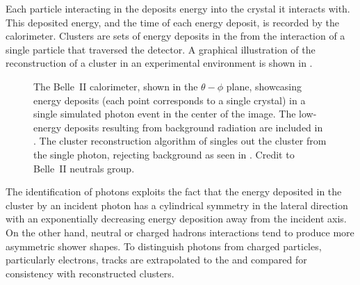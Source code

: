 Each particle interacting in the \ECL deposits energy into the crystal it interacts with.
This deposited energy, and the time of each energy deposit, is recorded by the calorimeter.
Clusters are sets of energy deposits in the \ECL from the interaction of a single particle that traversed the detector.
A graphical illustration of the reconstruction of a cluster in an experimental environment is shown in .
\begin{figure}[htbp!]
    \centering
    \caption{\label{fig:clustering}
    The Belle~II calorimeter, shown in the $\theta-\phi$ plane, 
    showcasing energy deposits (each point corresponds to a single \ECL crystal) in a single simulated photon event in the center of the image.
    The low-energy deposits resulting from background radiation are included in .
    The cluster reconstruction algorithm of \basftwo singles out the cluster from the single photon, rejecting background as seen in .
    Credit to Belle~II neutrals group.
    }
\end{figure}

The identification of photons exploits the fact that the energy deposited in the cluster
by an incident photon has a cylindrical symmetry in the lateral direction with an exponentially decreasing energy deposition away from the incident axis.
On the other hand, neutral or charged hadrons interactions tend to produce more asymmetric shower shapes.
To distinguish photons from charged particles, particularly electrons, tracks are extrapolated to the \ECL and compared for consistency with reconstructed clusters.
